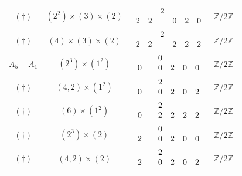\documentclass[11pt]{amsart}
\newcommand{\bZ}{{\mathbb Z}}
\numberwithin{equation}{section}
\begin{document}
\begin{center}
\begin{longtable}{|c|c|c|c|}
			$(\dagger)$ & $(2^2)\times (3)\times (2)$ & $\renewcommand{\arraystretch}{}\begin{array}{c c c c c c}
				&  & 2 & & & \\
				2 & 2  & & 0 & 2 & 0   \\
			\end{array}$ & $\bZ/2\bZ$\\
			$(\dagger)$ & $(4)\times (3)\times (2)$ & $\renewcommand{\arraystretch}{}\begin{array}{c c c c c c}
				&  & 2 & & & \\
				2 & 2 & & 2 & 2 & 2   \\
			\end{array}$ & $\bZ/2\bZ$\\
			\hline
			$A_5+A_1$ & $(2^3)\times (1^2)$ & $\renewcommand{\arraystretch}{}\begin{array}{c c c c c c}
				&  & 0 & & & \\
				0 &  & 0 & 2 & 0 & 0   \\
			\end{array}$ & $\bZ/2\bZ$\\
			$(\dagger)$ & $(4,2)\times (1^2) $ & $\renewcommand{\arraystretch}{}\begin{array}{c c c c c c}
				&  & 2 & & & \\
				0 &  & 0 & 2 & 0 & 2   \\
			\end{array}$ & $\bZ/2\bZ$\\
			$(\dagger)$ & $(6)\times(1^2)$ & $\renewcommand{\arraystretch}{}\begin{array}{c c c c c c}
				&  & 2 & & & \\
				0 &  & 2 & 2 & 2 & 2   \\
			\end{array}$ & $\bZ/2\bZ$\\
			$(\dagger)$ & $(2^3)\times (2)$ & $\renewcommand{\arraystretch}{}\begin{array}{c c c c c c}
				&  & 0 & & & \\
				2 &  & 0 & 2 & 0 & 0   \\
			\end{array}$ & $\bZ/2\bZ$\\
			$(\dagger)$ & $(4,2)\times (2) $ & $\renewcommand{\arraystretch}{}\begin{array}{c c c c c c}
				&  & 2 & & & \\
				2 &  & 0 & 2 & 0 & 2   \\
			\end{array}$ & $\bZ/2\bZ$\\

\end{longtable}
\end{center}
\end{document}

